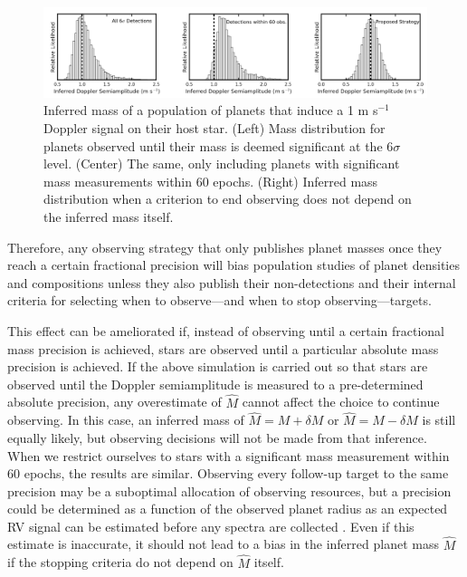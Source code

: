 \documentclass[rnaas]{aastex62}
\begin{document}
\begin{figure}[htp]

\centering
\includegraphics[width=.99\textwidth]{fig.pdf}\hfill


\caption{Inferred mass of a population of planets that induce a 1 m s$^{-1}$ Doppler signal on their host star. (Left) Mass distribution for planets observed until their mass is deemed significant at the $6\sigma$ level. (Center) The same, only including planets with significant mass measurements within 60 epochs. (Right) Inferred mass distribution when a criterion to end observing does not depend on the inferred mass itself.}
\label{fig}

\end{figure}

Therefore, any observing strategy that only publishes planet masses once they reach a certain fractional precision will bias population studies of planet densities and compositions unless they also publish their non-detections \citep[e.g.][]{Marcy14} and their internal criteria for selecting when to observe---and when to stop observing---targets.

This effect can be ameliorated if, instead of observing until a certain fractional mass precision is achieved, stars are observed until a particular absolute mass precision is achieved. 
If the above simulation is carried out so that stars are observed until the Doppler semiamplitude is measured to a pre-determined absolute precision, any overestimate of $\hat{M}$ cannot affect the choice to continue observing. In this case, an inferred mass of $\hat{M} = M + \delta M$ or $\hat{M} = M - \delta M$ is still equally likely, but observing decisions will not be made from that inference. When we restrict ourselves to stars with a significant mass measurement within 60 epochs, the results are similar. Observing every follow-up target to the same
precision may be a suboptimal allocation of observing resources, but a precision could
be determined as a function of the observed planet radius as an expected RV signal can be estimated before any spectra are collected \citep[e.g.][]{Wolfgang16, Chen17}. Even if this estimate is inaccurate, it should not lead to a bias in the inferred planet mass $\hat{M}$ if the stopping criteria do not depend on $\hat{M}$ itself.
\end{document}
